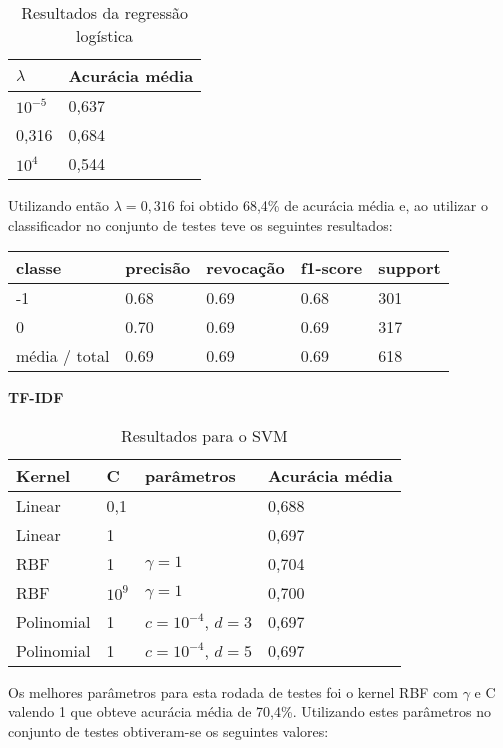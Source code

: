 \begin{table}[H]
	\centering
	\caption{Resultados da regressão logística}
	\begin{tabular}{l l}
		\hline
		$\lambda$ & Acurácia média \\
		\hline
		$10^{-5}$ & 0,637 \\
		\hline
		0,316 & 0,684 \\
		\hline
		$10^{4}$ & 0,544 \\
	\end{tabular}
\end{table}

Utilizando então $\lambda = 0,316$ foi obtido 68,4\% de acurácia média e, ao utilizar
o classificador no conjunto de testes teve os seguintes resultados:

\begin{table}[H]
	\centering
		\begin{tabular}{l | l | l | l | l}
		\hline
		classe  	&	precisão  &  revocação &  f1-score &  support \\
		\hline
		 -1    &   0.68   &   0.69   &   0.68   &    301 \\
		 \hline
          0    &   0.70   &   0.69   &   0.69   &    317 \\
		\hline
		média / total   &    0.69   &   0.69   &   0.69   &    618 \\
		\hline
	\end{tabular}
\end{table}

\textbf{TF-IDF}

\begin{table}[H]
	\centering
	\caption{Resultados para o SVM}
	\begin{tabular}{l l l l}
		\hline
		Kernel & C & parâmetros & Acurácia média \\
		\hline
		Linear & 0,1 & & 0,688 \\
		\hline
		Linear & 1 & & 0,697 \\
		\hline
		RBF & 1 & $\gamma = 1$ & 0,704 \\
		\hline
		RBF & $10^{9}$ & $\gamma = 1$ & 0,700 \\
		\hline
		Polinomial & 1 & $c = 10^{-4}$, $d = 3$ & 0,697 \\
		\hline
		Polinomial & 1 & $c = 10^{-4}$, $d = 5$ & 0,697 \\
		\hline
	\end{tabular}
\end{table}

Os melhores parâmetros para esta rodada de testes foi o kernel RBF com $\gamma$ e C valendo 1 que
obteve acurácia média de 70,4\%. Utilizando estes parâmetros no conjunto de testes obtiveram-se os
seguintes valores:


